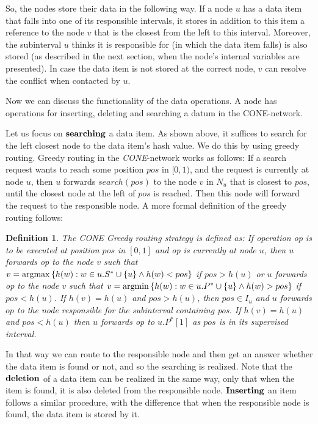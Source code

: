\documentclass[11pt]{article}
\newtheorem{definition}[theorem]{Definition}
\def\argmin{{\rm argmin}}
\def\argmax{{\rm argmax}}
\begin{document}
So, the nodes store their data in the following way. If a node $u$ has a data item that falls into one of its responsible intervals, it stores in addition to this item a reference to the node $v$  that is the closest from the left to this interval. Moreover, the subinterval $u$ thinks it is responsible for (in which the data item falls) is also stored (as described in the next section, when the node's internal variables are presented).
 In case the data item is not stored at the correct node, $v$ can resolve the conflict when contacted by $u$.

Now we can discuss the functionality of the data operations.
A node has operations for inserting, deleting and searching a datum in the CONE-network.

Let us focus on $\bf{searching}$ a data item. As shown above, it suffices to search for the left closest node to the data item's hash value.
We do this by using greedy routing. Greedy routing in the \emph{CONE}-network works as follows: If a search request wants to reach some
position $pos$ in $[0,1)$, and the request is currently at node $u$, then $u$ forwards $search(pos)$ to the node $v$ in $N_u$ that is closest to $pos$, until the closest node at the left of $pos$ is reached. Then this node will forward the request to the responsible node.
A more formal definition of the greedy routing follows:

\begin{definition}
The CONE Greedy routing strategy is defined as: If operation op is to be executed at position $pos$ in $[0,1]$ and op is currently at node $u$, then $u$ forwards op to the node $v$ such that $v=\argmax \left\{h(w): w \in u.S^* \cup \left\{u\right\} \wedge h(w)< pos\right\}$ if $pos>h(u)$ or $u$ forwards op to the node $v$ such that $v=\argmin \left\{h(w): w\in u.P^* \cup \left\{u\right\} \wedge h(w)> pos\right\}$ if $pos<h(u)$. If $h(v)=h(u)$ and $pos>h(u)$, then $pos \in I_u$ and $u$ forwards $op$ to the node responsible for the subinterval containing pos. If $h(v)=h(u)$ and $pos<h(u)$ then $u$ forwards op to $u.P^*[1]$ as $pos$ is in its supervised interval.
\end{definition}

 In that way we can route to the responsible node and then get an answer whether the data item is found or not, and so the searching is realized.
Note that the $\bf{deletion}$ of a data item can be realized in the same way, only that when the item is found, it is also deleted from the responsible node.
$\bf{Inserting}$ an item follows a similar procedure, with the difference that when the responsible node is found, the data item is stored by it.
\end{document}
